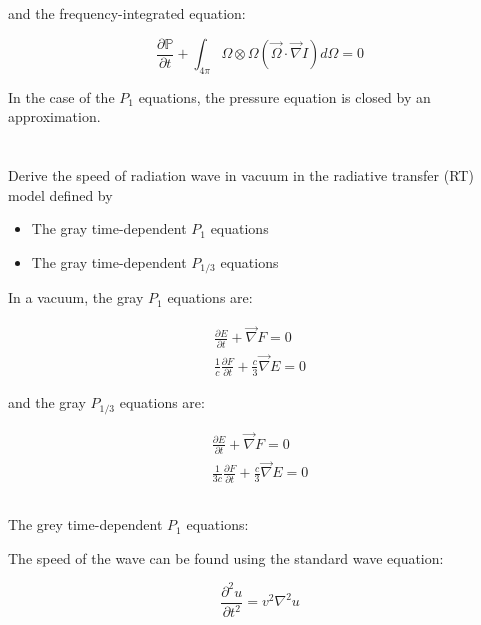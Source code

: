 \documentclass{template}
\begin{document}
and the frequency-integrated equation:

\begin{equation}
    \boxed{\frac{\partial \mathbb{P}}{\partial t} +  \int_{4\pi} \Omega \otimes \Omega (\vec{\Omega}\cdot\vec{\nabla}I)d\Omega = 0}
\end{equation}

In the case of the $P_1$ equations, the pressure equation is closed by an approximation.




\section{} Derive the speed of radiation wave in vacuum in the radiative transfer (RT) model defined by

\begin{itemize}
    \item The gray time-dependent $P_1$ equations
    \item The gray time-dependent $P_{1/3}$ equations
\end{itemize}

In a vacuum, the gray $P_1$ equations are:

\begin{gather}\label{eq:gray-p1}
    \frac{\partial E}{\partial t} + \vec{\nabla} F = 0\\
    \frac{1}{c}\frac{\partial F}{\partial t} + \frac{c}{3}\vec{\nabla}E = 0
\end{gather}

and the gray $P_{1/3}$ equations are:

\begin{gather}\label{eq:gray-p13}
    \frac{\partial E}{\partial t} + \vec{\nabla} F = 0\\
    \frac{1}{3c}\frac{\partial F}{\partial t} + \frac{c}{3}\vec{\nabla}E = 0
\end{gather}


\subsection{} The grey time-dependent $P_1$ equations:

The speed of the wave can be found using the standard wave equation:

\begin{equation}\label{eq:wave-eqn}
    \frac{\partial^2 u}{\partial t^2} = v^2 \nabla^2 u
\end{equation}
\end{document}
